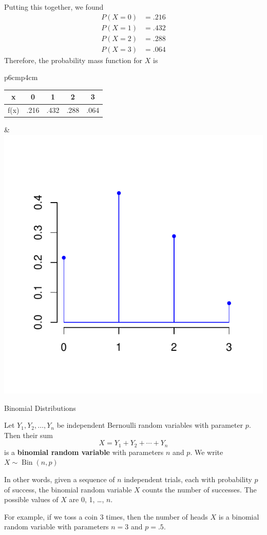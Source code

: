 \documentclass[xcolor=table]{beamer}
\DeclareMathOperator{\Bin}{Bin}
\renewcommand{\emph}{\textbf}
\begin{document}
\begin{frame}
Putting this together, we found
\begin{align*}
P(X=0)&=.216 \\
P(X=1)&=.432 \\
P(X=2)&= .288 \\
P(X=3)&= .064
\end{align*}
Therefore, the probability mass function for $X$ is 

\begin{tabular}{p{6cm}p{4cm}}
\vspace{1cm}
\begin{tabular}{c||c|c|c|c}
x & 0 & 1 & 2 & 3 \\ \hline
f(x) & .216 & .432 & .288 & .064
\end{tabular}
&
\vspace{-1cm}
\includegraphics[scale=.5]{ch3_pmf5.pdf}
\vspace{-2cm}
\end{tabular}
\end{frame}

\begin{frame}{Binomial Distributions}
\begin{block}{}
Let $Y_1, Y_2, \dots, Y_n$ be independent Bernoulli random variables with parameter $p$. Then their sum
$$X=Y_1+Y_2+\cdots+Y_n$$
is a \emph{binomial random variable} with parameters $n$ and $p$. We write $X\sim \Bin(n,p)$
\end{block}
\pause In other words, given a sequence of $n$ independent trials, each with probability $p$ of success,  the binomial random variable $X$ counts the number of successes. The possible values of $X$ are 0, 1, \dots, $n$.

\vspace{.2cm}
\pause For example, if we toss a coin 3 times, then the number of heads $X$ is a binomial random variable with parameters $n=3$ and $p=.5$.
\end{frame}
\end{document}
